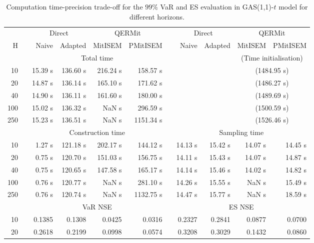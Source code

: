 \footnotesize{  
{ \renewcommand{\arraystretch}{1.3} 
\begin{longtable}{rr rrrr r rrrr}  
\caption{Computation time-precision trade-off for the  $99\%$ VaR and ES evaluation in GAS(1,1)-$t$ model for different horizons.} 
\label{tab:time_precision_t_gas} \\ 
 & & \multicolumn{2}{c}{Direct} & \multicolumn{2}{c}{QERMit}&  & \multicolumn{2}{c}{Direct} & \multicolumn{2}{c}{QERMit} \\ \cline{3-6} \cline{8-11} 
 H & & Naive & Adapted & MitISEM & PMitISEM & & Naive & Adapted & MitISEM & PMitISEM \\ \hline 
 & & \multicolumn{4}{c}{Total time} & & && \multicolumn{2}{c}{(Time initialisation)} \\ \cline{3-6} \cline{10-11}
10 & & 15.39 s & 136.60 s & 216.24 s & 158.57 s &&&& \multicolumn{2}{c}{(1484.95 s)} \\ 
20 & & 14.87 s & 136.14 s & 165.10 s & 171.62 s &&&& \multicolumn{2}{c}{(1486.27 s)} \\ 
40 & & 14.90 s & 136.11 s & 161.60 s & 180.00 s &&&& \multicolumn{2}{c}{(1489.69 s)} \\ 
100 & & 15.02 s & 136.32 s &  NaN s & 296.59 s &&&& \multicolumn{2}{c}{(1500.59 s)} \\ 
250 & & 15.23 s & 136.51 s &  NaN s & 1151.34 s &&&& \multicolumn{2}{c}{(1526.46 s)} \\ 
\hline 
 & & \multicolumn{4}{c}{Construction time} & & \multicolumn{4}{c}{ Sampling time} \\ \cline{3-6}  \cline{8-11}
10 & & 1.27 s & 121.18 s & 202.17 s & 144.12 s && 14.13 s & 15.42 s & 14.07 s & 14.45 s \\ 
20 & & 0.75 s & 120.70 s & 151.03 s & 156.75 s && 14.11 s & 15.43 s & 14.07 s & 14.87 s \\ 
40 & & 0.75 s & 120.65 s & 147.58 s & 165.17 s && 14.14 s & 15.46 s & 14.02 s & 14.82 s \\ 
100 & & 0.76 s & 120.77 s &  NaN s & 281.10 s && 14.26 s & 15.55 s &  NaN s & 15.49 s \\ 
250 & & 0.76 s & 120.74 s &  NaN s & 1132.75 s && 14.47 s & 15.77 s &  NaN s & 18.59 s \\ 
\hline 
 & & \multicolumn{4}{c}{VaR NSE} &&  \multicolumn{4}{c}{ES NSE} \\ \cline{3-6}  \cline{8-11}
10 && 0.1385  & 0.1308  & 0.0425 & 0.0316 && 0.2327  & 0.2841  & 0.0877 & 0.0700 \\ 
20 && 0.2618  & 0.2199  & 0.0998 & 0.0574 && 0.3208  & 0.3029  & 0.1432 & 0.0860 \\ 

\end{longtable}}}
